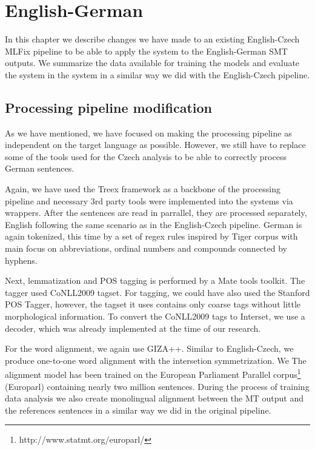 \chapter{English-German}
\label{chap:german}

In this chapter we describe changes we have made to an existing
English-Czech MLFix pipeline to be able to apply the system to the English-German
SMT outputs. We summarize the data available for training the models
and evaluate the system in the system in a similar way we did with the English-Czech
pipeline.

\section{Processing pipeline modification}

As we have mentioned, we have focused on making the processing pipeline as independent
on the target language as possible. However, we still have to replace some of the tools
used for the Czech analysis to be able to correctly process German sentences.

Again, we have used the Treex framework as a backbone of the processing pipeline and
necessary 3rd party tools were implemented into the systems via wrappers.
After the sentences are read in parrallel, they are processed separately, English
following the same scenario as in the English-Czech pipeline.
German is again tokenized, this time by a set of regex rules inspired by Tiger corpus\cite{Brants2004}
with main focus on abbreviations, ordinal numbers and compounds connected by hyphens.

Next, lemmatization and POS tagging is performed by a Mate tools
toolkit. The tagger used CoNLL2009\cite{CoNLL-2009-ST} tagset. For tagging, we could have also
used the Stanford POS Tagger\cite{Toutanova:2000:EKS:1117794.1117802},
however, the tagset it uses contains only coarse tags without little morphological information.
To convert the CoNLL2009 tags to Interset, we use a decoder, which was already implemented at the
time of our research.

For the word alignment, we again use GIZA++. Similar to English-Czech, we produce one-to-one word alignment
with the intersetion symmetrization. We The alignment model has been trained on the European
Parliament Parallel corpus\cite{koehn2005epc}\footnote{http://www.statmt.org/europarl/} (Europarl)
containing nearly two million sentences. During the process of training data analysis we 
also create monolingual alignment between the MT output and the references sentences
in a similar way we did in the original pipeline.

